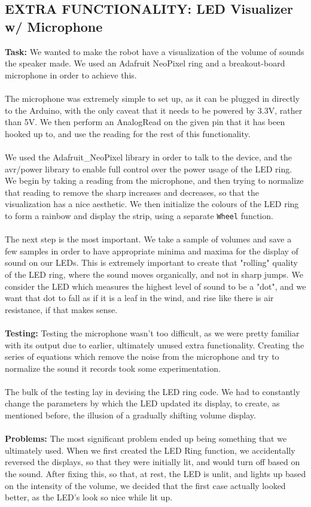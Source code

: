 \documentclass[paper=a4, fontsize=11pt]{scrartcl}
\numberwithin{equation}{section}		%
\numberwithin{figure}{section}			%
\numberwithin{table}{section}				%
\begin{document}
{\subsection{EXTRA FUNCTIONALITY: LED Visualizer w/ Microphone}
\textbf{Task: } We wanted to make the robot have a visualization of the volume of sounds the speaker made. We used an Adafruit NeoPixel ring and a breakout-board microphone in order to achieve this. 
\\\\
The microphone was extremely simple to set up, as it can be plugged in directly to the Arduino, with the only caveat that it needs to be powered by 3.3V, rather than 5V. We then perform an AnalogRead on the given pin that it has been hooked up to, and use the reading for the rest of this functionality.
\\\\
We used the Adafruit\_NeoPixel library in order to talk to the device, and the avr/power library to enable full control over the power usage of the LED ring. We begin by taking a reading from the microphone, and then trying to normalize that reading to remove the sharp increases and decreases, so that the visualization has a nice aesthetic. We then initialize the colours of the LED ring to form a rainbow and display the strip, using a separate \texttt{Wheel} function.
\\\\
The next step is the most important. We take a sample of volumes and save a few samples in order to have appropriate minima and maxima for the display of sound on our LEDs. This is extremely important to create that "rolling" quality of the LED ring, where the sound moves organically, and not in sharp jumps. We consider the LED which measures the highest level of sound to be a "dot", and we want that dot to fall as if it is a leaf in the wind, and rise like there is air resistance, if that makes sense.
\\\\
\textbf{Testing: } Testing the microphone wasn't too difficult, as we were pretty familiar with its output due to earlier, ultimately unused extra functionality. Creating the series of equations which remove the noise from the microphone and try to normalize the sound it records took some experimentation.
\\\\
The bulk of the testing lay in devising the LED ring code. We had to constantly change the parameters by which the LED updated its display, to create, as mentioned before, the illusion of a gradually shifting volume display.
\\\\
\textbf{Problems: }The most significant problem ended up being something that we ultimately used. When we first created the LED Ring function, we accidentally reversed the displays, so that they were initially lit, and would turn off based on the sound. After fixing this, so that, at rest, the LED is unlit, and lights up based on the intensity of the volume, we decided that the first case actually looked better, as the LED's look so nice while lit up.
}
\end{document}
